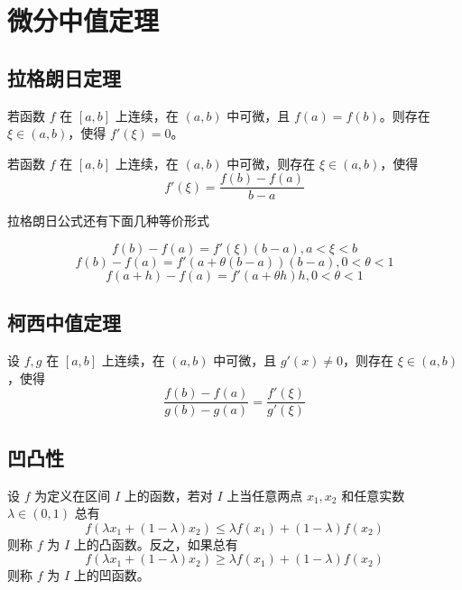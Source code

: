 \chapter{微分中值定理}

\section{拉格朗日定理}

\begin{theorem}
    若函数 $f$ 在 $[a,b]$ 上连续，在 $(a,b)$ 中可微，且 $f(a)=f(b)$。则存在 $\xi\in(a,b)$，使得 $f'(\xi)=0$。
\end{theorem}

\begin{theorem}
    若函数 $f$ 在 $[a,b]$ 上连续，在 $(a,b)$ 中可微，则存在 $\xi\in(a,b)$，使得
    $$f'(\xi)=\frac{f(b)-f(a)}{b-a}$$
\end{theorem}

拉格朗日公式还有下面几种等价形式

$$f(b)-f(a) = f'(\xi)(b-a),a<\xi<b$$
$$f(b)-f(a) = f'(a+\theta(b-a))(b-a),0<\theta<1$$
$$f(a+h) - f(a) = f'(a+\theta h)h,0<\theta<1$$

\section{柯西中值定理}

\begin{theorem}
    设 $f,g$ 在 $[a,b]$ 上连续，在 $(a,b)$ 中可微，且 $g'(x)\ne 0$，则存在 $\xi\in (a,b)$，使得
    $$\frac{f(b)-f(a)}{g(b)-g(a)} = \frac{f'(\xi)}{g'(\xi)}$$
\end{theorem}

\section{凹凸性}

\begin{definition}
    设 $f$ 为定义在区间 $I$ 上的函数，若对 $I$ 上当任意两点 $x_1,x_2$ 和任意实数 $\lambda\in (0,1)$ 总有
    $$f(\lambda x_1+(1-\lambda)x_2) \leqslant \lambda f(x_1)+(1-\lambda)f(x_2)$$
    则称 $f$ 为 $I$ 上的凸函数。反之，如果总有
    $$f(\lambda x_1+(1-\lambda)x_2) \geqslant \lambda f(x_1)+(1-\lambda)f(x_2)$$
    则称 $f$ 为 $I$ 上的凹函数。
\end{definition}

